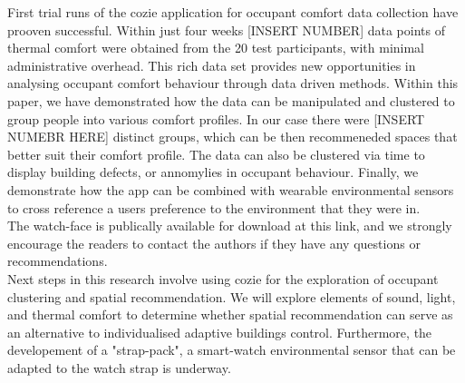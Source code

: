 
First trial runs of the cozie application for occupant comfort data collection have prooven successful. Within just four weeks [INSERT NUMBER] data points of thermal comfort were obtained from the 20 test participants, with minimal administrative overhead. This rich data set provides new opportunities in analysing occupant comfort behaviour through data driven methods. Within this paper, we have demonstrated how the data can be manipulated and clustered to group people into various comfort profiles. In our case there were [INSERT NUMEBR HERE] distinct groups, which can be then recommeneded spaces that better suit their comfort profile. The data can also be clustered via time to display building defects, or annomylies in occupant behaviour. Finally, we demonstrate how the app can be combined with wearable environmental sensors to cross reference a users preference to the environment that they were in.\\

The watch-face is publically available for download at this link, and we strongly encourage the readers to contact the authors if they have any questions or recommendations.\\

Next steps in this research involve using cozie for the exploration of occupant clustering and spatial recommendation. We will explore elements of sound, light, and thermal comfort to determine whether spatial recommendation can serve as an alternative to individualised adaptive buildings control. Furthermore, the developement of a "strap-pack", a smart-watch environmental sensor that can be adapted to the watch strap is underway. 